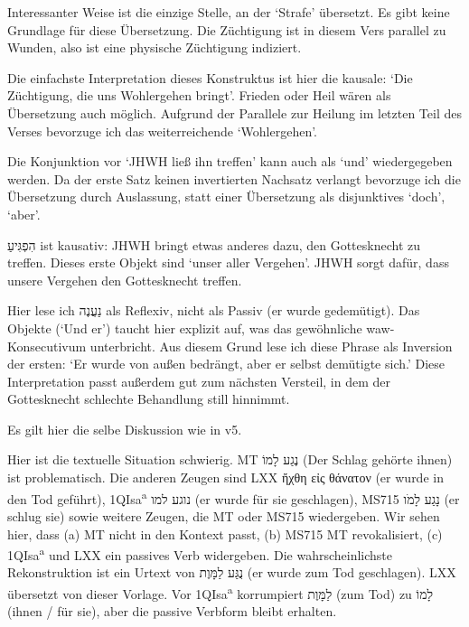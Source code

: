 \begin{description}
{		Interessanter Weise ist  die einzige Stelle, an der \Cite{elb} `Strafe' übersetzt. Es gibt keine Grundlage für diese Übersetzung.
		}
		Die Züchtigung ist in diesem Vers parallel zu Wunden, also ist eine physische Züchtigung indiziert.
	\item[zu unserem Wohlergehen] Die einfachste Interpretation dieses Konstruktus ist hier die kausale: `Die Züchtigung, die uns Wohlergehen bringt'.
		Frieden oder Heil wären als Übersetzung auch möglich.
		Aufgrund der Parallele zur Heilung im letzten Teil des Verses bevorzuge ich das weiterreichende `Wohlergehen'.
	\item[6] Die Konjunktion vor `JHWH ließ ihn treffen' kann auch als `und' wiedergegeben werden.
		Da der erste Satz keinen invertierten Nachsatz verlangt bevorzuge ich die Übersetzung durch Auslassung, statt einer Übersetzung als disjunktives `doch', `aber'.
	\item[ließ ihn treffen] הִפְגִּיעַ ist kausativ: JHWH bringt etwas anderes dazu, den Gottesknecht zu treffen.
		Dieses erste Objekt sind `unser aller Vergehen'. JHWH sorgt dafür, dass unsere Vergehen den Gottesknecht treffen.
	\item[7 er demütigte sich] Hier lese ich נַעֲנֶה als Reflexiv, nicht als Passiv (er wurde gedemütigt).
		Das Objekte (`Und er') taucht hier explizit auf, was das gewöhnliche waw-Konsecutivum unterbricht.
		Aus diesem Grund lese ich diese Phrase als Inversion der ersten: `Er wurde von außen bedrängt, aber er selbst demütigte sich.'
		Diese Interpretation passt außerdem gut zum nächsten Versteil, in dem der Gottesknecht schlechte Behandlung still hinnimmt.
	\item[8 aufgrund] Es gilt hier die selbe Diskussion wie in v5.
	\item[wurde er zum Tod geschlagen] Hier ist die textuelle Situation schwierig. MT נֶגַע לָמוֹ (Der Schlag gehörte ihnen) ist problematisch.
		Die anderen Zeugen sind LXX ἤχθη εἰς θάνατον (er wurde in den Tod geführt), 1QIsa\textsuperscript{a} נוגע למו (er wurde für sie geschlagen), MS715 נָגַע לָמֹו (er schlug sie)
		sowie weitere Zeugen, die MT oder MS715 wiedergeben.
		Wir sehen hier, dass (a) MT nicht in den Kontext passt, (b) MS715 MT revokalisiert, (c) 1QIsa\textsuperscript{a} und LXX ein passives Verb widergeben.
		Die wahrscheinlichste Rekonstruktion ist ein Urtext von נֻגַּע לַמָּוֶת (er wurde zum Tod geschlagen).
		LXX übersetzt von dieser Vorlage.
		Vor 1QIsa\textsuperscript{a} korrumpiert לַמָּוֶת (zum Tod) zu לָמוֹ (ihnen / für sie), aber die passive Verbform bleibt erhalten.

\end{description}
